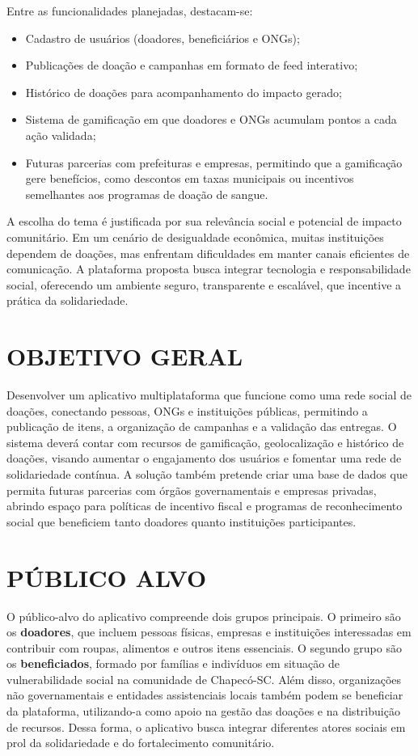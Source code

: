 \documentclass[%
  article,%
  a4paper,%
  12pt,%
  fleqn,%
  oneside,%
  chapter = TITLE,%
  section = TITLE,%
]{abntex2}
\begin{document}
Entre as funcionalidades planejadas, destacam-se:
\begin{itemize}
    \item Cadastro de usuários (doadores, beneficiários e ONGs);
    \item Publicações de doação e campanhas em formato de feed interativo;
    \item Histórico de doações para acompanhamento do impacto gerado;
    \item Sistema de gamificação em que doadores e ONGs acumulam pontos a cada ação validada;
    \item Futuras parcerias com prefeituras e empresas, permitindo que a gamificação gere benefícios, como descontos em taxas municipais ou incentivos semelhantes aos programas de doação de sangue.
\end{itemize}

A escolha do tema é justificada por sua relevância social e potencial de impacto comunitário. Em um cenário de desigualdade econômica, muitas instituições dependem de doações, mas enfrentam dificuldades em manter canais eficientes de comunicação. A plataforma proposta busca integrar tecnologia e responsabilidade social, oferecendo um ambiente seguro, transparente e escalável, que incentive a prática da solidariedade.

\section{OBJETIVO GERAL}

Desenvolver um aplicativo multiplataforma que funcione como uma rede social de doações, conectando pessoas, ONGs e instituições públicas, permitindo a publicação de itens, a organização de campanhas e a validação das entregas. O sistema deverá contar com recursos de gamificação, geolocalização e histórico de doações, visando aumentar o engajamento dos usuários e fomentar uma rede de solidariedade contínua. A solução também pretende criar uma base de dados que permita futuras parcerias com órgãos governamentais e empresas privadas, abrindo espaço para políticas de incentivo fiscal e programas de reconhecimento social que beneficiem tanto doadores quanto instituições participantes.

\section{PÚBLICO ALVO}

O público-alvo do aplicativo compreende dois grupos principais. O primeiro são os \textbf{doadores}, que incluem pessoas físicas, empresas e instituições interessadas em contribuir com roupas, alimentos e outros itens essenciais. O segundo grupo são os \textbf{beneficiados}, formado por famílias e indivíduos em situação de vulnerabilidade social na comunidade de Chapecó-SC. 
Além disso, organizações não governamentais e entidades assistenciais locais também podem se beneficiar da plataforma, utilizando-a como apoio na gestão das doações e na distribuição de recursos. Dessa forma, o aplicativo busca integrar diferentes atores sociais em prol da solidariedade e do fortalecimento comunitário.

\postextual%
\newpage
\printbibliography%

\end{document}
